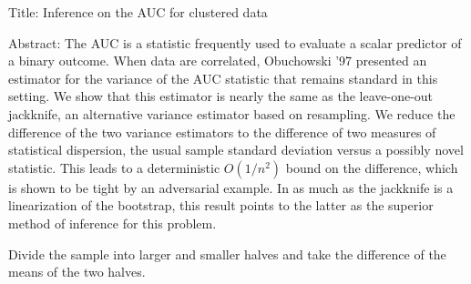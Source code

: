 \documentclass{article}
\begin{document}
Title: Inference on the AUC for clustered data

Abstract: The AUC is a statistic frequently used to evaluate a scalar
predictor of a binary outcome. When data are correlated, Obuchowski
'97 presented an estimator for the variance of the AUC statistic that
remains standard in this setting. We show that this estimator is
nearly the same as the leave-one-out jackknife, an alternative
variance estimator based on resampling. We reduce the difference of
the two variance estimators to the difference of two measures of
statistical dispersion, the usual sample standard deviation versus a
possibly novel statistic. This leads to a deterministic $O(1/n^2)$ bound
on the difference, which is shown to be tight by an adversarial
example. In as much as the jackknife is a linearization of the
bootstrap, this result points to the latter as the superior method of
inference for this problem.

Divide the sample into larger and smaller halves and take the
difference of the means of the two halves.
\end{document}
